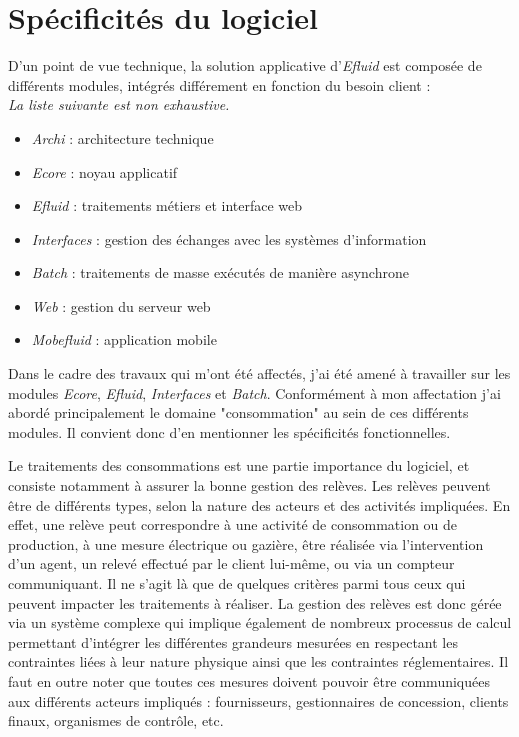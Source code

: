 \documentclass[a4paper, 12pt]{report}
\begin{document}
\section{Spécificités du logiciel}

D'un point de vue technique, la solution applicative d'\textit{Efluid} est composée de différents modules, intégrés différement en fonction du besoin client :\\

\textit{La liste suivante est non exhaustive.}

\begin{itemize}
  \item \textit{Archi} : architecture technique
  \item \textit{Ecore} : noyau applicatif
  \item \textit{Efluid} : traitements métiers et interface web
  \item \textit{Interfaces} : gestion des échanges avec les systèmes d'information
  \item \textit{Batch} : traitements de masse exécutés de manière asynchrone
  \item \textit{Web} : gestion du serveur web
  \item \textit{Mobefluid} : application mobile
\end{itemize}
\vspace{0.5cm}

Dans le cadre des travaux qui m'ont été affectés, j'ai été amené à travailler sur les modules \textit{Ecore}, \textit{Efluid}, \textit{Interfaces} et \textit{Batch}. Conformément à mon affectation j'ai abordé principalement le domaine "consommation" au sein de ces différents modules. Il convient donc d'en mentionner les spécificités fonctionnelles.

Le traitements des consommations est une partie importance du logiciel, et consiste notamment à assurer la bonne gestion des relèves. Les relèves peuvent être de différents types, selon la nature des acteurs et des activités impliquées. En effet, une relève peut correspondre à une activité de consommation ou de production, à une mesure électrique ou gazière, être réalisée via l'intervention d'un agent, un relevé effectué par le client lui-même, ou via un compteur communiquant. Il ne s'agit là que de quelques critères parmi tous ceux qui peuvent impacter les traitements à réaliser. La gestion des relèves est donc gérée via un système complexe qui implique également de nombreux processus de calcul permettant d'intégrer les différentes grandeurs mesurées en respectant les contraintes liées à leur nature physique ainsi que les contraintes réglementaires. Il faut en outre noter que toutes ces mesures doivent pouvoir être communiquées aux différents acteurs impliqués : fournisseurs, gestionnaires de concession, clients finaux, organismes de contrôle, etc.
\end{document}
